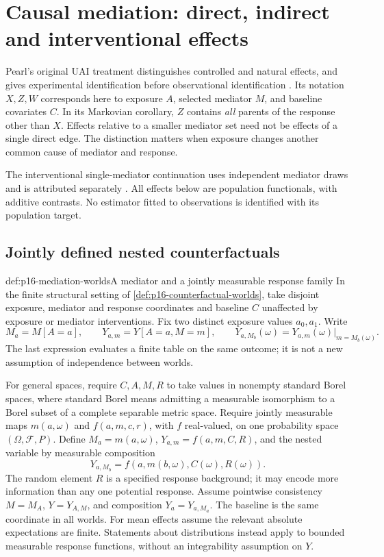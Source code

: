 \section{Causal mediation: direct, indirect and interventional effects}
\label{sec:p16-causal-mediation}

Pearl's original UAI treatment distinguishes controlled and natural effects,
and gives experimental identification before observational identification
\cite[Secs.~3.1--3.7]{Pearl2001DirectIndirectEffects}.
Its notation \(X,Z,W\) corresponds here to exposure \(A\), selected mediator
\(M\), and baseline covariates \(C\). In its Markovian corollary, \(Z\)
contains \emph{all} parents of the response other than \(X\). Effects
relative to a smaller mediator set need not be effects of a single direct
edge. The distinction matters when exposure changes another common cause
of mediator and response.

The interventional single-mediator continuation uses independent mediator
draws and is attributed separately
\cite[author manuscript pp.~2--4]{VansteelandtDaniel2017InterventionalEffects}.
All effects below are population functionals, with additive contrasts.
No estimator fitted to observations is identified with its population target.

\subsection{Jointly defined nested counterfactuals}

\begin{hbdefinition}{def:p16-mediation-worlds}{A mediator and a jointly measurable response family}
In the finite structural setting of \cref{def:p16-counterfactual-worlds},
take disjoint exposure, mediator and response coordinates and baseline
\(C\) unaffected by exposure or mediator interventions. Fix two distinct
exposure values \(a_0,a_1\). Write
\[
 M_a=M[A=a],\qquad Y_{a,m}=Y[A=a,M=m],\qquad
 Y_{a,M_b}(\omega)=Y_{a,m}(\omega)\big|_{m=M_b(\omega)}.
\]
The last expression evaluates a finite table on the same outcome; it is
not a new assumption of independence between worlds.

For general spaces, require \(C,A,M,R\) to take values in nonempty
standard Borel spaces, where standard Borel means admitting a measurable
isomorphism to a Borel subset of a complete separable metric space.
Require jointly measurable maps \(m(a,\omega)\) and
\(f(a,m,c,r)\), with \(f\) real-valued, on one probability space
\((\Omega,\mathcal F,P)\).
Define \(M_a=m(a,\omega)\),
\(Y_{a,m}=f(a,m,C,R)\), and the nested variable by measurable composition
\[
 Y_{a,M_b}=f(a,m(b,\omega),C(\omega),R(\omega)).
\]
The random element \(R\) is a specified response background; it may
encode more information than any one potential response. Assume pointwise
consistency \(M=M_A\), \(Y=Y_{A,M}\), and composition
\(Y_a=Y_{a,M_a}\). The baseline is the same coordinate in all worlds.
For mean effects assume the relevant absolute expectations are finite.
Statements about distributions instead apply to bounded measurable
response functions, without an integrability assumption on \(Y\).
\end{hbdefinition}


